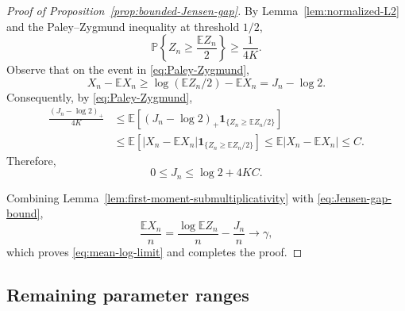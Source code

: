 \documentclass[12pt,preprint]{amsart}
\numberwithin{equation}{section}
\theoremstyle{plain}
\theoremstyle{definition}
\newcommand{\E}{\mathbb E}
\newcommand{\Pp}{\mathbb P}
\newcommand{\ind}{\mathbf 1}
\begin{document}
\begin{proof}[Proof of Proposition~\ref{prop:bounded-Jensen-gap}]
By Lemma~\ref{lem:normalized-L2} and the Paley--Zygmund inequality at
threshold $1/2$,
\begin{equation}
 \Pp\left\{Z_n\ge\frac{\E Z_n}{2}\right\}\ge\frac1{4K}.
 \label{eq:Paley-Zygmund}
\end{equation}
Observe that on the event in \eqref{eq:Paley-Zygmund},
\begin{equation}
 X_n-\E X_n\ge\log(\E Z_n/2)-\E X_n=J_n-\log2.
 \label{eq:jensen-event-comparison}
\end{equation}
Consequently, by \eqref{eq:Paley-Zygmund},
\[
\begin{aligned}
 \frac{(J_n-\log2)_+}{4K}
 &\le\E\left[(J_n-\log2)_+
   \ind_{\{Z_n\ge\E Z_n/2\}}\right]\\
 &\le\E\left[|X_n-\E X_n|
   \ind_{\{Z_n\ge\E Z_n/2\}}\right]
 \le\E|X_n-\E X_n|\le C.
\end{aligned}
\]
Therefore,
\begin{equation}
 0\le J_n\le\log2+4KC.
 \label{eq:Jensen-gap-bound}
\end{equation}

Combining Lemma~\ref{lem:first-moment-submultiplicativity} with
\eqref{eq:Jensen-gap-bound},
\[
 \frac{\E X_n}{n}
 =\frac{\log\E Z_n}{n}-\frac{J_n}{n}
 \longrightarrow \gamma,
\]
which proves \eqref{eq:mean-log-limit} and completes the proof.
\end{proof}

\subsection{Remaining parameter ranges}
\label{sec:remaining-ranges}
\end{document}

